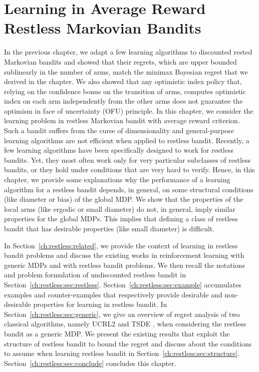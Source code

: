 \begingroup
\let\clearpage\relax

\chapter{Learning in Average Reward Restless Markovian Bandits}
\label{ch:learning_restless}

In the previous chapter, we adapt a few learning algorithms to discounted rested Markovian bandits and showed that their regrets, which are upper bounded sublinearly in the number of arms, match the minimax Bayesian regret that we derived in the chapter.
We also showed that any optimistic index policy that, relying on the confidence bonus on the transition of arms, computes optimistic index on each arm independently from the other arms does not guarantee the optimism in face of uncertainty (OFU) principle.
In this chapter, we consider the learning problem in restless Markovian bandit with average reward criterion.
Such a bandit suffers from the curse of dimensionality and general-purpose learning algorithms are not efficient when applied to restless bandit. Recently, a few learning algorithms have been specifically designed to work for restless bandits. Yet, they most often work only for very particular subclasses of restless bandits, or they hold under conditions that are very hard to verify.
Hence, in this chapter, we provide some explanations why the performance of a learning algorithm for a restless bandit depends, in general, on some structural conditions (like diameter or bias) of the global MDP. We show that the properties of the local arms (like ergodic or small diameter) do not, in general, imply similar properties for the global MDPs. This implies that defining a class of restless bandit that has desirable properties (like small diameter) is difficult. 

In Section~\ref{ch:restless:related}, we provide the context of learning in restless bandit problems and discuss the existing works in reinforcement learning with generic MDPs and with restless bandit problems.
We then recall the notations and problem formulation of undiscounted restless bandit in Section~\ref{ch:restless:sec:restless}.
Section~\ref{ch:restless:sec:example} accumulates examples and counter-examples that respectively provide desirable and non-desirable properties for learning in restless bandit.
In Section~\ref{ch:restless:sec:generic}, we give an overview of regret analysis of two classical algorithms, namely UCRL2 \cite{jaksch2010near} and TSDE \cite{ouyang2017learning}, when considering the restless bandit as a generic MDP.
We present the existing results that exploit the structure of restless bandit to bound the regret and discuss about the conditions to assume when learning restless bandit in Section~\ref{ch:restless:sec:structure}.
Section~\ref{ch:restless:sec:conclude} concludes this chapter.

